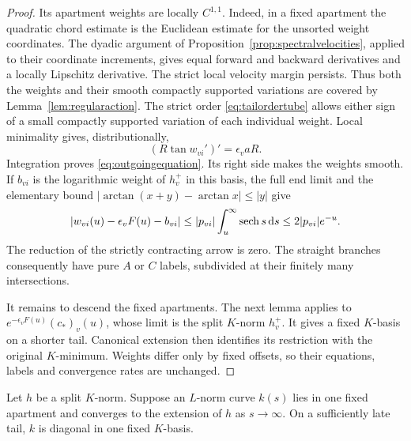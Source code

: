 \begin{proof}
Its apartment weights are locally $C^{1,1}$. Indeed, in a fixed
apartment the quadratic chord estimate is the Euclidean estimate
for the unsorted weight coordinates. The dyadic argument of
Proposition~\ref{prop:spectralvelocities}, applied to their coordinate
increments, gives equal forward and backward derivatives and a
locally Lipschitz derivative. The strict local velocity margin
persists. Thus both the weights and their smooth compactly
supported variations are covered by Lemma~\ref{lem:regularaction}. The strict order
\eqref{eq:tailordertube} allows either sign of a small compactly
supported variation of each individual weight. Local minimality
gives, distributionally,
\[
 (R\tan w_{vi}')'=\epsilon_v aR.
\]
Integration proves \eqref{eq:outgoingequation}. Its right side makes
the weights smooth. If $b_{vi}$ is the logarithmic weight of $h_v^+$
in this basis, the full end limit and the elementary bound
$|\arctan(x+y)-\arctan x|\le |y|$ give
\begin{equation}\label{eq:outgoingrate}
 |w_{vi}(u)-\epsilon_vF(u)-b_{vi}|
 \le |p_{vi}|\int_u^\infty\operatorname{sech} s\,\mathrm d s
 \le2|p_{vi}|e^{-u}.
\end{equation}
The reduction of the strictly contracting arrow is zero. The
straight branches consequently have pure $A$ or $C$ labels,
subdivided at their finitely many intersections.

It remains to descend the fixed apartments. The next lemma applies
to $e^{-\epsilon_vF(u)}(c_*)_v(u)$, whose limit is the split
$K$-norm $h_v^+$. It gives a fixed $K$-basis on a shorter tail.
Canonical extension then identifies its restriction with the
original $K$-minimum. Weights differ only by fixed offsets, so their
equations, labels and convergence rates are unchanged.
\end{proof}

\begin{lemma}\label{lem:taildescent}
Let $h$ be a split $K$-norm. Suppose an $L$-norm curve $k(s)$ lies
in one fixed apartment and converges to the extension of $h$ as
$s\to\infty$. On a sufficiently late tail, $k$ is diagonal in one
fixed $K$-basis.
\end{lemma}

